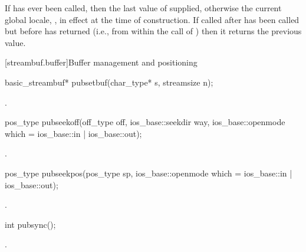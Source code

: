 \begin{itemdescr}
\pnum
\returns
If
has ever been called, then the last value of  supplied,
otherwise the current global locale,
,
in effect at the time of construction.
If called after
has been called but before
has returned (i.e., from within the call of
)
then it returns the previous value.
\end{itemdescr}

[streambuf.buffer]{Buffer management and positioning}

%
\begin{itemdecl}
basic_streambuf* pubsetbuf(char_type* s, streamsize n);
\end{itemdecl}

\begin{itemdescr}
\pnum
\returns
{}.
\end{itemdescr}

%
\begin{itemdecl}
pos_type pubseekoff(off_type off, ios_base::seekdir way,
                    ios_base::openmode which
                      = ios_base::in | ios_base::out);
\end{itemdecl}

\begin{itemdescr}
\pnum
\returns
{}.
\end{itemdescr}

%
\begin{itemdecl}
pos_type pubseekpos(pos_type sp,
                    ios_base::openmode which
                      = ios_base::in | ios_base::out);
\end{itemdecl}

\begin{itemdescr}
\pnum
\returns
{}.
\end{itemdescr}

%
\begin{itemdecl}
int pubsync();
\end{itemdecl}

\begin{itemdescr}
\pnum
\returns
{}.
\end{itemdescr}


